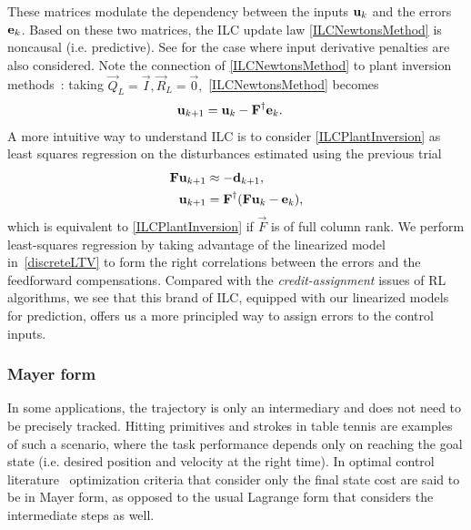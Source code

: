 %
\noindent These matrices modulate the dependency between the inputs $\boldsymbol{\mathrm{u}}_k$ and the errors $\boldsymbol{\mathrm{e}}_k$. Based on these two matrices, the ILC update law \eqref{ILCNewtonsMethod} is noncausal (i.e. predictive). See \cite{Amann95,Gunnarsson01} for the case where input derivative penalties are also considered. Note the connection of \eqref{ILCNewtonsMethod} to plant inversion methods~\cite{Bristow06}: taking $\vec{Q}_L = \vec{I}, \vec{R}_{L} = \vec{0},$ \eqref{ILCNewtonsMethod} becomes
%
\begin{equation}
\begin{aligned}
\boldsymbol{\mathrm{u}}_{k+1} &= \boldsymbol{\mathrm{u}}_k - \boldsymbol{\mathrm{F}}^{\dagger}\boldsymbol{\mathrm{e}}_k.
\end{aligned}
\label{ILCPlantInversion}
\end{equation}
%
%
\noindent A more intuitive way to understand ILC is to consider \eqref{ILCPlantInversion} as least squares regression on the disturbances estimated using the previous trial
%
\begin{equation}
\begin{aligned}
\boldsymbol{\mathrm{F}}\boldsymbol{\mathrm{u}}_{k+1} &\approx -\boldsymbol{\mathrm{d}}_{k+1},\\
\boldsymbol{\mathrm{u}}_{k+1} &= \boldsymbol{\mathrm{F}}^{\dagger}(\boldsymbol{\mathrm{F}}\boldsymbol{\mathrm{u}}_{k} - \boldsymbol{\mathrm{e}}_k),
\end{aligned}
\label{ILCasRegression}
\end{equation}
%
\noindent which is equivalent to \eqref{ILCPlantInversion} if $\vec{F}$ is of full column rank. We perform least-squares regression by taking advantage of the linearized model in~\eqref{discreteLTV} to form the right correlations between the errors and the feedforward compensations. Compared with the \emph{credit-assignment} issues of RL algorithms, we see that this brand of ILC, equipped with our linearized models for prediction, offers us a more principled way to assign errors to the control inputs.

\subsubsection{Mayer form}

In some applications, the trajectory is only an intermediary and does not need to be precisely tracked. Hitting primitives and strokes in table tennis are examples of such a scenario, where the task performance depends only on reaching the goal state (i.e. desired position and velocity at the right time). In optimal control literature~\cite{Liberzon11} optimization criteria that consider only the final state cost are said to be in Mayer form, as opposed to the usual Lagrange form that considers the intermediate steps as well.

